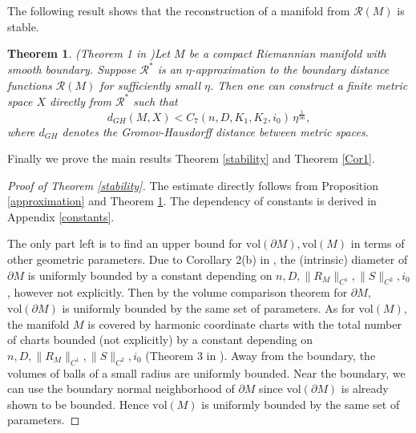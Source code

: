\documentclass[11pt,letterpaper]{amsart}
\numberwithin{equation}{section}
\theoremstyle{definition}
\theoremstyle{plain}
\theoremstyle{definition}
\theoremstyle{plain}
\newtheorem{2007}[volume]{Theorem}
\theoremstyle{definition}
\theoremstyle{plain}
\newcommand{\vol}{\textrm{vol}}
\begin{document}
The following result shows that the reconstruction of a manifold from $\mathcal{R}(M)$ is stable.

\begin{2007}(Theorem 1 in \cite{KKL2})\label{2007}
Let $M$ be a compact Riemannian manifold with smooth boundary. Suppose $\mathcal{R}^{\ast}$ is an $\eta$-approximation to the boundary distance functions $\mathcal{R}(M)$ for sufficiently small $\eta$. Then one can construct a finite metric space $X$ directly from $\mathcal{R}^{\ast}$ such that
$$d_{GH}(M,X)<C_7(n,D,K_1,K_2,i_0)\, \eta^{\frac{1}{36}},$$
where $d_{GH}$ denotes the Gromov-Hausdorff distance between metric spaces.
\end{2007}

\medskip
Finally we prove the main results Theorem \ref{stability} and Theorem \ref{Cor1}.

\begin{proof}[Proof of Theorem \ref{stability}]
The estimate directly follows from Proposition \ref{approximation} and Theorem \ref{2007}. The dependency of constants is derived in Appendix \ref{constants}.

The only part left is to find an upper bound for $\vol(\partial M),\vol(M)$ in terms of other geometric parameters. Due to Corollary 2(b) in \cite{KKL2}, the (intrinsic) diameter of $\partial M$ is uniformly bounded by a constant depending on $n,D,\|R_M\|_{C^1},\|S\|_{C^2},i_0$, however not explicitly. Then by the volume comparison theorem for $\partial M$, $\vol(\partial M)$ is uniformly bounded by the same set of parameters. As for $\vol(M)$, the manifold $M$ is covered by harmonic coordinate charts with the total number of charts bounded (not explicitly) by a constant depending on $n,D,\|R_M\|_{C^1},\|S\|_{C^2},i_0$ (Theorem 3 in \cite{KKL2}). Away from the boundary, the volumes of balls of a small radius are uniformly bounded. Near the boundary, we can use the boundary normal neighborhood of $\partial M$ since $\vol(\partial M)$ is already shown to be bounded. Hence $\vol(M)$ is uniformly bounded by the same set of parameters.
\end{proof}
\end{document}
